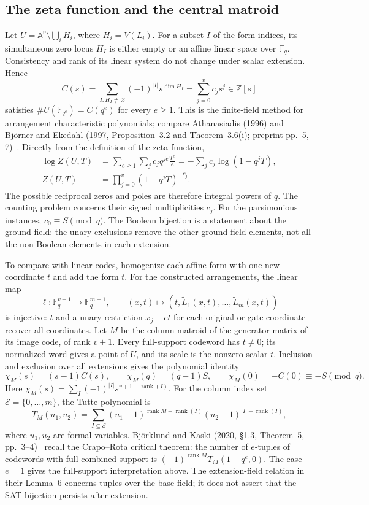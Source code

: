 \subsection{The zeta function and the central matroid}
Let $U=\mathbb A^v\setminus\bigcup_iH_i$, where $H_i=V(L_i)$. For a subset $I$ of the form indices, its simultaneous zero locus $H_I$ is either empty or an affine linear space over $\mathbb F_q$. Consistency and rank of its linear system do not change under scalar extension. Hence
\[
 C(s)=\sum_{I:H_I\ne\varnothing}(-1)^{|I|}s^{\dim H_I}
          =\sum_{j=0}^vc_js^j\in\mathbb Z[s]
\]
satisfies $\#U(\mathbb F_{q^e})=C(q^e)$ for every $e\ge1$. This is the finite-field method for arrangement characteristic polynomials; compare Athanasiadis (1996) and Bj\"orner and Ekedahl (1997, Proposition~3.2 and Theorem~3.6(i); preprint pp.~5, 7)~\cite{st-ath,st-be}. Directly from the definition of the zeta function,
\begin{align*}
 \log Z(U,T)
 &=\sum_{e\ge1}\sum_jc_jq^{je}\frac{T^e}{e}
   =-\sum_jc_j\log(1-q^jT),\\
 Z(U,T)&=\prod_{j=0}^v(1-q^jT)^{-c_j}.
\end{align*}
The possible reciprocal zeros and poles are therefore integral powers of $q$. The counting problem concerns their signed multiplicities $c_j$. For the parsimonious instances, $c_0\equiv S\pmod q$. The Boolean bijection is a statement about the ground field: the unary exclusions remove the other ground-field elements, not all the non-Boolean elements in each extension.

To compare with linear codes, homogenize each affine form with one new coordinate $t$ and add the form $t$. For the constructed arrangements, the linear map
\[
 \ell:\mathbb F_q^{v+1}\longrightarrow\mathbb F_q^{m+1},
 \qquad (x,t)\longmapsto(t,\widetilde L_1(x,t),\ldots,
                                     \widetilde L_m(x,t))
\]
is injective: $t$ and a unary restriction $x_j-ct$ for each original or gate coordinate recover all coordinates. Let $M$ be the column matroid of the generator matrix of its image code, of rank $v+1$. Every full-support codeword has $t\ne0$; its normalized word gives a point of $U$, and its scale is the nonzero scalar $t$. Inclusion and exclusion over all extensions gives the polynomial identity
\begin{equation}
\label{ar:eq:matroid}
 \chi_M(s)=(s-1)C(s),\qquad
 \chi_M(q)=(q-1)S,\qquad \chi_M(0)=-C(0)\equiv-S\pmod q.
\end{equation}
Here $\chi_M(s)=\sum_I(-1)^{|I|}s^{v+1-\operatorname{rank}(I)}$.
For the column index set $\mathcal E=\{0,\ldots,m\}$, the Tutte polynomial is
\[
 T_M(u_1,u_2)=\sum_{I\subseteq\mathcal E}
 (u_1-1)^{\operatorname{rank}M-\operatorname{rank}(I)}
 (u_2-1)^{|I|-\operatorname{rank}(I)},
\]
where $u_1,u_2$ are formal variables.
Björklund and Kaski (2020, \S1.3, Theorem~5, pp.~3--4)~\cite{st-bk} recall the Crapo--Rota critical theorem: the number of $e$-tuples of codewords with full combined support is $(-1)^{\operatorname{rank}M}T_M(1-q^e,0)$. The case $e=1$ gives the full-support interpretation above. The extension-field relation in their Lemma~6 concerns tuples over the base field; it does not assert that the SAT bijection persists after extension.

